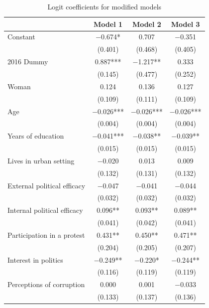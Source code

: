 \documentclass[12pt,a4]{article}\usepackage[]{graphicx}\usepackage[]{xcolor}
\begin{document}


\begin{table}[htbp]
\begin{center}
\caption{Logit coefficients for modified models}
\label{tab:complexmod}

\begin{tabular}[t]{lccc}
\toprule
  & Model 1 & Model 2 & Model 3\\
\midrule
Constant & \num{-0.674}* & \num{0.707} & \num{-0.351}\\
 & (\num{0.401}) & (\num{0.468}) & (\num{0.405})\\
2016 Dummy & \num{0.887}*** & \num{-1.217}** & \num{0.333}\\
 & (\num{0.145}) & (\num{0.477}) & (\num{0.252})\\
Woman & \num{0.124} & \num{0.136} & \num{0.127}\\
 & (\num{0.109}) & (\num{0.111}) & (\num{0.109})\\
Age & \num{-0.026}*** & \num{-0.026}*** & \num{-0.026}***\\
 & (\num{0.004}) & (\num{0.004}) & (\num{0.004})\\
Years of education & \num{-0.041}*** & \num{-0.038}** & \num{-0.039}**\\
 & (\num{0.015}) & (\num{0.015}) & (\num{0.015})\\
Lives in urban setting & \num{-0.020} & \num{0.013} & \num{0.009}\\
 & (\num{0.132}) & (\num{0.131}) & (\num{0.132})\\
External political efficacy & \num{-0.047} & \num{-0.041} & \num{-0.044}\\
 & (\num{0.032}) & (\num{0.032}) & (\num{0.032})\\
Internal political efficacy & \num{0.096}** & \num{0.093}** & \num{0.089}**\\
 & (\num{0.041}) & (\num{0.042}) & (\num{0.041})\\
Participation in a protest & \num{0.431}** & \num{0.450}** & \num{0.471}**\\
 & (\num{0.204}) & (\num{0.205}) & (\num{0.207})\\
Interest in politics & \num{-0.249}** & \num{-0.220}* & \num{-0.244}**\\
 & (\num{0.116}) & (\num{0.119}) & (\num{0.119})\\
Perceptions of corruption & \num{0.000} & \num{0.001} & \num{-0.033}\\
 & (\num{0.133}) & (\num{0.137}) & (\num{0.136})\\

\end{tabular}
\end{center}
\end{table}
\end{document}
